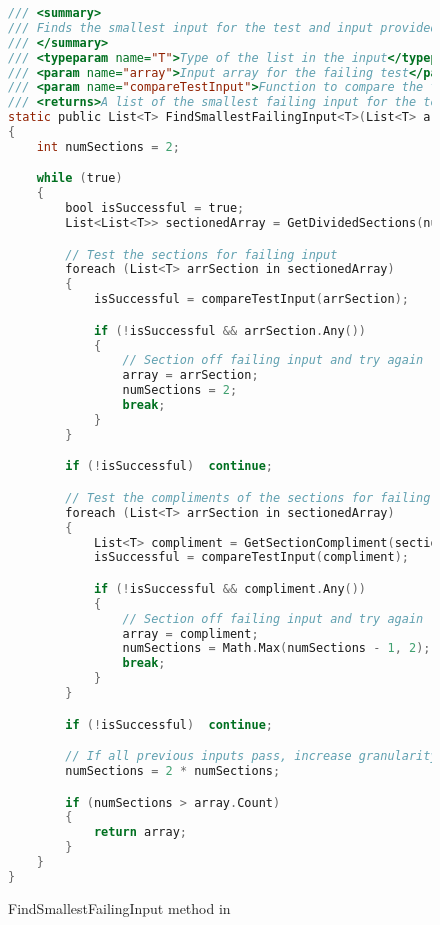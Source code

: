 
\label{FindSmallestInput Method}


\begin{figure}
\begin{lstlisting}[language=C]
/// <summary>
/// Finds the smallest input for the test and input provided for the test to continue to fail
/// </summary>
/// <typeparam name="T">Type of the list in the input</typeparam>
/// <param name="array">Input array for the failing test</param>
/// <param name="compareTestInput">Function to compare the test input against</param>
/// <returns>A list of the smallest failing input for the test to continue to fail</returns>
static public List<T> FindSmallestFailingInput<T>(List<T> array, Func<List<T>, bool> compareTestInput)
{
	int numSections = 2;

	while (true)
	{
		bool isSuccessful = true;
		List<List<T>> sectionedArray = GetDividedSections(numSections, array);

		// Test the sections for failing input
		foreach (List<T> arrSection in sectionedArray)
		{
			isSuccessful = compareTestInput(arrSection);

			if (!isSuccessful && arrSection.Any())
			{
				// Section off failing input and try again
				array = arrSection;
				numSections = 2;
				break;
			}
		}

		if (!isSuccessful)	continue;

		// Test the compliments of the sections for failing input
		foreach (List<T> arrSection in sectionedArray)
		{
			List<T> compliment = GetSectionCompliment(sectionedArray, sectionedArray.IndexOf(arrSection));
			isSuccessful = compareTestInput(compliment);

			if (!isSuccessful && compliment.Any())
			{
				// Section off failing input and try again
				array = compliment;
				numSections = Math.Max(numSections - 1, 2);
				break;
			}
		}

		if (!isSuccessful)	continue;

		// If all previous inputs pass, increase granularity, create more equal parts
		numSections = 2 * numSections;

		if (numSections > array.Count)
		{
			return array;
		}
	}
}

\end{lstlisting}
\caption{FindSmallestFailingInput method in \mytool}
\label{fig:FindSmallestFailingInput1}
\end{figure}
